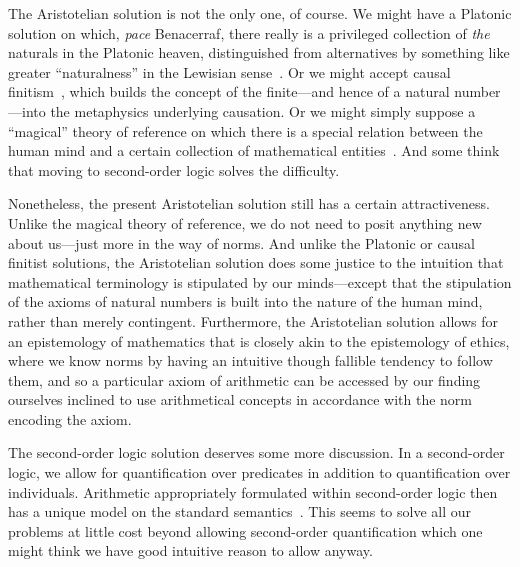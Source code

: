 The Aristotelian solution is not the only one, of course. We might have a Platonic solution on which, \textit{pace} Benacerraf,
there really is a privileged collection of \textit{the} naturals in the Platonic heaven, distinguished from alternatives by 
something like greater ``naturalness'' in the Lewisian sense~\parencite{LewisNewWork}. Or we might accept causal finitism~\parencite{KoonsKalaam,PrussInfinity},
which builds the concept of the finite---and hence of a natural number---into the metaphysics underlying causation. 
Or we might simply suppose a ``magical'' theory of reference on which there is a special relation between the human 
mind and a certain collection of mathematical entities~. And some think that moving to second-order logic solves the
difficulty.

Nonetheless, the present Aristotelian solution still has a certain attractiveness. Unlike the magical theory of reference, we do not need 
to posit anything new about us---just more in the way of norms. And unlike the Platonic or causal finitist solutions, the
Aristotelian solution does some justice to the intuition that mathematical terminology is stipulated by our minds---except 
that the stipulation of the axioms of natural numbers is built into the nature of the human mind, rather than merely contingent.
Furthermore, the Aristotelian solution allows for an epistemology of mathematics that is closely akin to the epistemology 
of ethics, where we know norms by having an intuitive though fallible tendency to follow them, and so a particular axiom of 
arithmetic can be accessed by our finding ourselves inclined to use arithmetical concepts in accordance with the norm encoding
the axiom.

The second-order logic solution deserves some more discussion. In a second-order logic, we allow
for quantification over predicates in addition to quantification over individuals. Arithmetic 
appropriately formulated within second-order logic then has a unique model on the standard 
semantics~\parencite[ch.~4]{Enderton}. This seems to solve all our problems at little cost beyond allowing second-order
quantification which one might think we have good intuitive reason to allow anyway.

